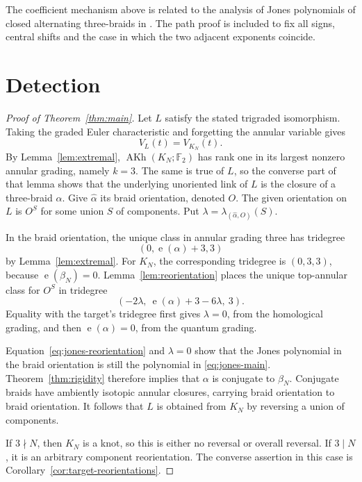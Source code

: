 \documentclass[11pt]{amsart}
\theoremstyle{remark}
\newcommand{\F}{\mathbb F_2}
\newcommand{\AKh}{\operatorname{AKh}}
\newcommand{\e}{\operatorname{e}}
\begin{document}
The coefficient mechanism above is related to the analysis of Jones polynomials of
closed alternating three-braids in \cite{Chbili}.  The path proof is included to fix
all signs, central shifts and the case in which the two adjacent exponents coincide.

\section{Detection}

\begin{proof}[Proof of Theorem~\ref{thm:main}]
Let \(L\) satisfy the stated trigraded isomorphism.  Taking the graded Euler
characteristic and forgetting the annular variable gives
\begin{equation}\label{eq:jones-main}
  V_L(t)=V_{K_N}(t).
\end{equation}
By Lemma~\ref{lem:extremal}, \(\AKh(K_N;\F)\) has rank one in its largest nonzero
annular grading, namely \(k=3\).  The same is true of \(L\), so the converse part of
that lemma shows that the underlying unoriented link of \(L\) is the closure of a
three-braid \(\alpha\).  Give \(\widehat\alpha\) its braid orientation, denoted \(O\).
The given orientation on \(L\) is \(O^S\) for some union \(S\) of components.  Put
\(\lambda=\lambda_{(\widehat\alpha,O)}(S)\).

In the braid orientation, the unique class in annular grading three has tridegree
\[
  (0,\e(\alpha)+3,3)
\]
by Lemma~\ref{lem:extremal}.  For \(K_N\), the corresponding tridegree is
\((0,3,3)\), because \(\e(\beta_N)=0\).  Lemma~\ref{lem:reorientation} places the
unique top-annular class for \(O^S\) in tridegree
\[
  (-2\lambda,\ \e(\alpha)+3-6\lambda,\ 3).
\]
Equality with the target's tridegree first gives \(\lambda=0\), from the homological
grading, and then \(\e(\alpha)=0\), from the quantum grading.

Equation~\eqref{eq:jones-reorientation} and \(\lambda=0\) show that the Jones
polynomial in the braid orientation is still the polynomial in
\eqref{eq:jones-main}.  Theorem~\ref{thm:rigidity} therefore implies that \(\alpha\)
is conjugate to \(\beta_N\).  Conjugate braids have ambiently isotopic annular
closures, carrying braid orientation to braid orientation.  It follows that \(L\)
is obtained from \(K_N\) by reversing a union of components.

If \(3\nmid N\), then \(K_N\) is a knot, so this is either no reversal or overall
reversal.  If \(3\mid N\), it is an arbitrary component reorientation.  The converse
assertion in this case is Corollary~\ref{cor:target-reorientations}.
\end{proof}
\end{document}
